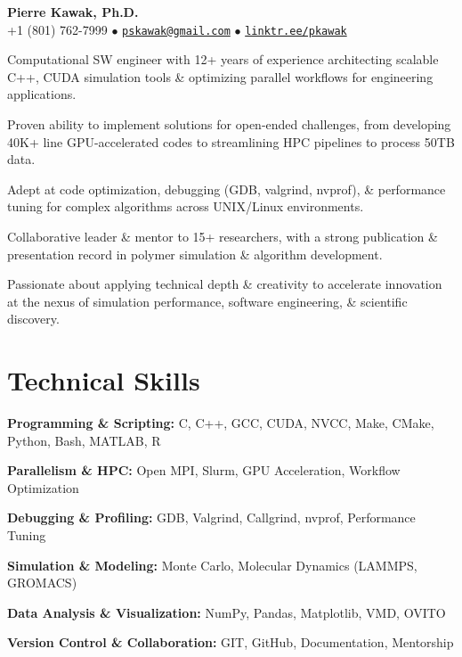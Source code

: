 \begin{center}
  {\LARGE \textbf{Pierre Kawak, Ph.D.} }\\[1ex]
  +1 (801) 762-7999 $\bullet$ \href{mailto:pskawak@gmail.com}{\tt pskawak@gmail.com} $\bullet$ \href{https://linktr.ee/pkawak}{\tt linktr.ee/pkawak}\\
\end{center}
\begin{tabitemize}
  \item Computational SW engineer with 12+ years of experience architecting scalable C++, CUDA simulation tools \& optimizing parallel workflows for engineering applications.
  \item Proven ability to implement solutions for open-ended challenges, from developing 40K+ line GPU-accelerated codes to streamlining HPC pipelines to process 50TB data.
  \item Adept at code optimization, debugging (GDB, valgrind, nvprof), \& performance tuning for complex algorithms across UNIX/Linux environments.
  \item Collaborative leader \& mentor to 15+ researchers, with a strong publication \& presentation record in polymer simulation \& algorithm development.
  \item Passionate about applying technical depth \& creativity to accelerate innovation at the nexus of simulation performance, software engineering, \& scientific discovery.
\end{tabitemize}
\vspace{-2.0\baselineskip}
\section*{Technical Skills}
\begin{tabitemize}
  \item \textbf{Programming \& Scripting:} C, C++, GCC, CUDA, NVCC, Make, CMake, Python, Bash, MATLAB, R
  \item \textbf{Parallelism \& HPC:} Open MPI, Slurm, GPU Acceleration, Workflow Optimization
  \item \textbf{Debugging \& Profiling:} GDB, Valgrind, Callgrind, nvprof, Performance Tuning
  \item \textbf{Simulation \& Modeling:} Monte Carlo, Molecular Dynamics (LAMMPS, GROMACS)
  \item \textbf{Data Analysis \& Visualization:} NumPy, Pandas, Matplotlib, VMD, OVITO
  \item \textbf{Version Control \& Collaboration:} GIT, GitHub, Documentation, Mentorship
\end{tabitemize}
\vspace{-1.2\baselineskip}
